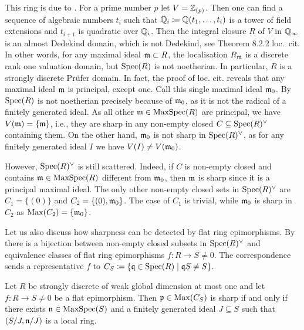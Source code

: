 \documentclass[reqno,a4paper]{amsart}
\begin{document}
\begin{example}
    This ring is due to \cite[\S 8.2]{sharp}. For a prime number $p$ let $V=\mathbb{Z}_{(p)}$. Then one can find a sequence of algebraic numbers $t_i$ such that $\mathbb{Q}_i\coloneqq\mathbb{Q}(t_1,\hdots,t_i)$ is a tower of field extensions and $t_{i+1}$ is quadratic over $\mathbb{Q}_i$. Then the integral closure $R$ of $V$ in $\mathbb{Q}_\infty$ is an almost Dedekind domain, which is not Dedekind, see Theorem 8.2.2 loc.\ cit. In other words, for any maximal ideal $\mathfrak{m}\subset R$, the localisation $R_{\mathfrak{m}}$ is a discrete rank one valuation domain, but $\operatorname{Spec}(R)$ is not noetherian. In particular, $R$ is a strongly discrete Prüfer domain. In fact, the proof of loc. cit. reveals that any maximal ideal $\mathfrak{m}$ is principal, except one. Call this single maximal ideal $\mathfrak{m}_0$. By \cite[Proposition 2.2]{noethSpec} $\operatorname{Spec}(R)$ is not noetherian precisely because of $\mathfrak{m}_0$, as it is not the radical of a finitely generated ideal. As all other $\mathfrak{m}\in\operatorname{MaxSpec}(R)$ are principal, we have $V(\mathfrak{m})=\{\mathfrak{m}\}$, i.e., they are sharp in any non-empty closed $C\subseteq\operatorname{Spec}(R)^\vee$ containing them. On the other hand, $\mathfrak{m}_0$ is not sharp in $\operatorname{Spec}(R)^\vee$, as for any finitely generated ideal $I$ we have $V(I)\neq V(\mathfrak{m}_0)$.
    
    However, $\operatorname{Spec}(R)^\vee$ is still scattered.
    Indeed, if $C$ is non-empty closed and contains $\mathfrak{m}\in\operatorname{MaxSpec}(R)$ different from $\mathfrak{m}_0$, then $\mathfrak{m}$ is sharp since it is a principal maximal ideal.    
    The only other non-empty closed sets in $\operatorname{Spec}(R)^\vee$ are $C_1=\{(0)\}$ and $C_2=\{(0),\mathfrak{m}_0\}$. The case of $C_1$ is trivial, while $\mathfrak{m}_0$ is sharp in $C_2$ as $\operatorname{Max}(C_2)=\{\mathfrak{m}_0\}$.
\end{example}
Let us also discuss how sharpness can be detected by flat ring epimorphisms. By \cite[Proposition 6.7]{gldm1} there is a bijection between non-empty closed subsets in $\operatorname{Spec}(R)^\vee$ and equivalence classes of flat ring epimorphisms $f\colon R\to S\neq0$. The correspondence sends a representative $f$ to $C_S\coloneqq\{\mathfrak{q}\in\operatorname{Spec}(R)\mid \mathfrak{q} S\neq S\}$.
\begin{lemma}\label{lem:sharpepi}
    Let $R$ be strongly discrete of weak global dimension at most one and let $f\colon R\to S\neq0$ be a flat epimorphism. Then $\mathfrak{p}\in\operatorname{Max}(C_S)$ is sharp if and only if there exists $\mathfrak{n}\in\operatorname{MaxSpec}(S)$ and a finitely generated ideal $J\subseteq S$ such that $(S/J,\mathfrak{n}/J)$ is a local ring.
\end{lemma}
\end{document}
